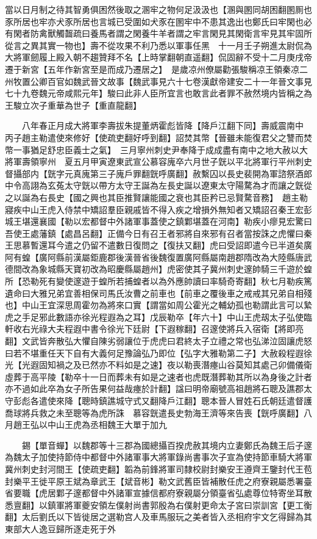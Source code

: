 當以日月制之待其智勇俱困然後取之溷牢之物何足汲汲也【溷與圂同胡困翻圂厠也豕所居也牢亦犬豕所居也言城已受圍如犬豕在圂牢中不患其逸出也鄭氏曰牢閑也必有閑者防禽獸觸齧疏曰養馬者謂之閑養牛羊者謂之牢言閑見其閑衛言牢見其牢固所從言之異其實一物也】壽不從攻果不利乃悉以軍事任黑　十一月壬子朔進太尉侃為大將軍劒履上殿入朝不趨贊拜不名【上時掌翻朝直遥翻】侃固辭不受十二月庚戌帝遷于新宮【五年作新宮至是而成乃遷居之】　是歲凉州僚屬勸張駿稱凉王領秦凉二州牧置公卿百官如魏武晉文故事【魏武事見六十七卷漢獻帝建安二十一年晉文事見七十九卷魏元帝咸熙元年】駿曰此非人臣所宜言也敢言此者罪不赦然境内皆稱之為王駿立次子重華為世子【重直龍翻】

　　八年春正月成大將軍李壽拔朱提董炳霍彪皆降【降戶江翻下同】壽威震南中　丙子趙主勒遣使來修好【使疏吏翻好呼到翻】詔焚其幣【晉雖未能復君父之讐而焚幣一事猶足舒忠臣義士之氣】　三月寧州刺史尹奉降于成成盡有南中之地大赦以大將軍壽領寧州　夏五月甲寅遼東武宣公慕容廆卒六月世子皝以平北將軍行平州刺史督攝部内【皝字元真廆第三子廆戶罪翻皝呼廣翻】赦繫囚以長史裴開為軍諮祭酒郎中令高詡為玄菟太守皝以帶方太守王誕為左長史誕以遼東太守陽騖為才而讓之皝從之以誕為右長史【國之興也其臣推賢讓能國之衰也其臣矜已忌賢騖音務】　趙主勒寢疾中山王虎入侍禁中矯詔羣臣親戚皆不得入疾之增損外無知者又矯詔召秦王宏彭城王堪還襄國【勒以宏都督中外諸軍事蓋使之鎮鄴堪蓋在河南】勒疾小瘳見宏驚曰吾使王處藩鎮【處昌呂翻】正備今日有召王者邪將自來邪有召者當按誅之虎懼曰秦王思慕暫還耳今遣之仍留不遣數日復問之【復扶又翻】虎曰受詔即遣今已半道矣廣阿有蝗【廣阿縣前漢屬鉅鹿郡後漢晉省後魏復置廣阿縣屬南趙郡隋改為大陸縣唐武德間改為象城縣天寶初改為昭慶縣屬趙州】虎密使其子冀州刺史邃帥騎三千遊於蝗所【恐勒死有變使邃遊于蝗所若捕蝗者以為外應帥讀曰率騎奇寄翻】秋七月勒疾篤遺命曰大雅兄弟宜善相保司馬氏汝曹之前車也【前車之覆後車之戒戒其兄弟自相殘也】中山王宜深思周霍勿為將來口實【謂當如周公霍光之輔幼孤也勒謂此言可以縶虎之手足邪此數語亦徐光程遐為之耳】戊辰勒卒【年六十】中山王虎刼太子弘使臨軒收右光祿大夫程遐中書令徐光下廷尉【下遐稼翻】召邃使將兵入宿衛【將即亮翻】文武皆奔散弘大懼自陳劣弱讓位于虎虎曰君終太子立禮之常也弘涕泣固讓虎怒曰若不堪重任天下自有大義何足豫論弘乃即位【弘字大雅勒第二子】大赦殺程遐徐光【光遐固知禍之及已然亦不料如是之速】夜以勒喪潛瘞山谷莫知其處己卯備儀衛虛葬于高平陵【勒卒十一日而葬未有如是之速者也虎既潛葬勒其所以為身後之計者亦不過如此卒為女子所告果何益哉瘞於計翻】諡曰明帝廟號高祖趙將石聰及譙郡太守彭彪各遣使來降【聰時鎮譙城守式又翻降戶江翻】聰本晉人冒姓石氏朝廷遣督護喬球將兵救之未至聰等為虎所誅　慕容皝遣長史勃海王濟等來告喪【皝呼廣翻】八月趙王弘以中山王虎為丞相魏王大單于加九

　　錫【單音蟬】以魏郡等十三郡為國總攝百揆虎赦其境内立妻鄭氏為魏王后子邃為魏太子加使持節侍中都督中外諸軍事大將軍錄尚書事次子宣為使持節車騎大將軍冀州刺史封河間王【使疏吏翻】韜為前鋒將軍司隸校尉封樂安王遵齊王鑒封代王苞封樂平王徙平原王斌為章武王【斌音彬】勒文武舊臣皆補散任虎之府寮親屬悉署臺省要職【虎居鄴子邃都督中外諸軍宣據信都府寮親屬分領臺省弘處尊位特寄坐耳散悉亶翻】以鎮軍將軍夔安領左僕射尚書郭殷為右僕射更命太子宮曰崇訓宮【更工衡翻】太后劉氏以下皆徙居之選勒宫人及車馬服玩之美者皆入丞相府宇文乞得歸為其東部大人逸豆歸所逐走死于外

